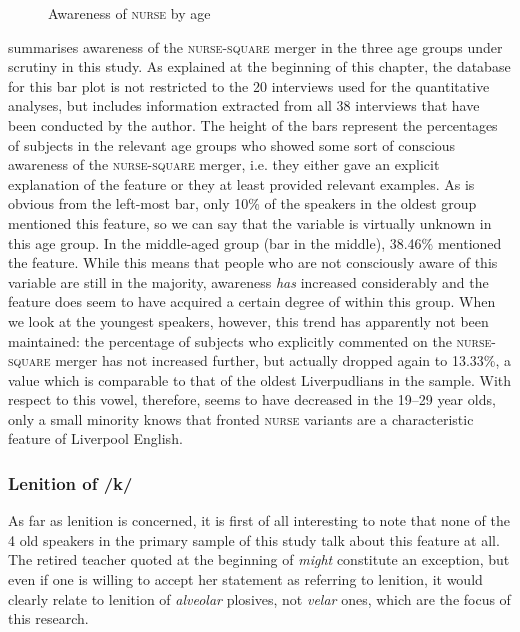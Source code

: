 \begin{figure}[h]
	\centering
		\resizebox{.49\linewidth}{!}{} 
	\caption{Awareness of \textsc{nurse} by age}
	\label{fig.aware.nurse}
\end{figure}

 summarises awareness of the \textsc{nurse}-\textsc{square} merger in the three age groups under scrutiny in this study.
As explained at the beginning of this chapter, the database for this bar plot is not restricted to the 20 interviews used for the quantitative analyses, but includes information extracted from all 38 interviews that have been conducted by the author.
The height of the bars represent the percentages of subjects in the relevant age groups who showed some sort of conscious awareness of the \textsc{nurse}-\textsc{square} merger, i.e. they either gave an explicit explanation of the feature or they at least provided relevant examples.
As is obvious from the left-most bar, only 10\% of the speakers in the oldest group mentioned this feature, so we can say that the variable is virtually unknown in this age group.
In the middle-aged group (bar in the middle), 38.46\% mentioned the feature.
While this means that people who are not consciously aware of this variable are still in the majority, awareness \emph{has} increased considerably and the feature does seem to have acquired a certain degree of  within this group.
When we look at the youngest speakers, however, this trend has apparently not been maintained: the percentage of subjects who explicitly commented on the \textsc{nurse}-\textsc{square} merger has not increased further, but actually dropped again to 13.33\%, a value which is comparable to that of the oldest Liverpudlians in the sample.
With respect to this vowel, therefore,  seems to have decreased in the 19--29 year olds, only a small minority knows that fronted \textsc{nurse} variants are a characteristic feature of Liverpool English.

\subsubsection{Lenition of /k/}
\label{aware_res.phon.k}

As far as lenition is concerned, it is first of all interesting to note that none of the 4 old speakers in the primary sample of this study talk about this feature at all.
The retired teacher quoted at the beginning of  \emph{might} constitute an exception, but even if one is willing to accept her statement as referring to lenition, it would clearly relate to lenition of \emph{alveolar} plosives, not \emph{velar} ones, which are the focus of this research.

